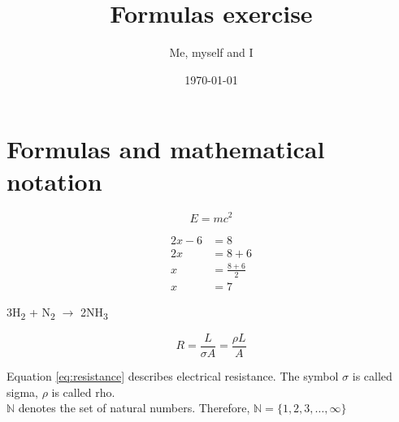 \documentclass[a4paper]{article}
\title{Formulas exercise}
\author{Me, myself and I}
\date{\today}
\begin{document}
\maketitle
	


\section*{Formulas and mathematical notation}
\begin{equation*}
    E = mc^2
\end{equation*}


\begin{align*} 
2x - 6 &=  8 \\ 
2x &=  8 + 6\\
  x  &= \frac{8 + 6}{2}\\
  x &= 7
\end{align*}

\begin{center}
\noindent 3H\textsubscript{2} + N\textsubscript{2} $\rightarrow$ 2NH\textsubscript{3}    
\end{center}


\begin{equation} \label{eq:resistance}
    R = \frac{L}{{\sigma A}} = \frac{{\rho L}}{A}
\end{equation}	

\noindent Equation \ref{eq:resistance} describes electrical resistance. The symbol $\sigma$ is called sigma, $\rho$ is called rho.\\

\noindent $\mathbb{N}$ denotes the set of natural numbers. Therefore, $ \mathbb{N}=\{1,2,3,\ldots,\infty\} $

\newpage



		
\end{document}
